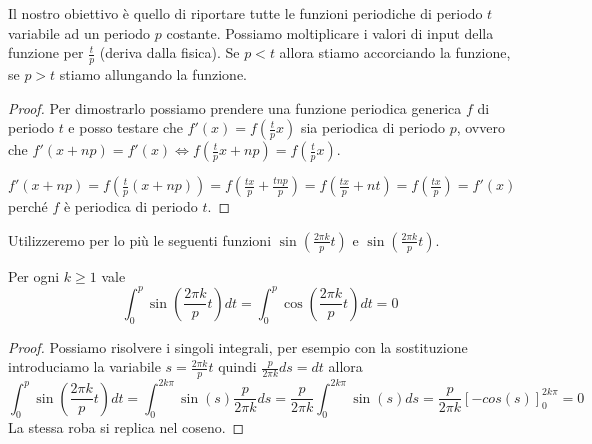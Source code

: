 Il nostro obiettivo è quello di riportare tutte le funzioni periodiche di periodo $t$
variabile ad un periodo $p$ costante. Possiamo moltiplicare i valori di input della 
funzione per $\frac{t}{p}$ (deriva dalla fisica). Se $p<t$ allora stiamo accorciando 
la funzione, se $p>t$ stiamo allungando la funzione.

\begin{proof}
    Per dimostrarlo possiamo prendere una funzione periodica generica $f$ di periodo $t$
    e posso testare che $f'(x) = f(\frac{t}{p}x)$ sia periodica di periodo $p$, 
    ovvero che $f'(x+np) = f'(x) \iff f(\frac{t}{p}x + np) = f(\frac{t}{p}x)$.

    $f'(x+np) = f(\frac{t}{p}(x + np))= f(\frac{tx}{p} + \frac{tnp}{p}) = f(\frac{tx}{p} + nt)
    =f(\frac{tx}{p}) =f'(x)$ perché $f$ è periodica di periodo $t$.
\end{proof}

Utilizzeremo per lo più le seguenti funzioni $\sin (\frac{2\pi k}{p}t)$ e $\sin (\frac{2\pi k}{p}t)$.
\begin{nota}
    Per ogni $k \ge 1$ vale
    \begin{equation*}
        \int_{0}^{p}\sin \left(\frac{2\pi k}{p}t\right) dt =  
        \int_{0}^{p}\cos \left(\frac{2\pi k}{p}t\right) dt = 0
    \end{equation*}
    \begin{proof}
        Possiamo risolvere i singoli integrali, per esempio con la sostituzione 
        introduciamo la variabile $s= \frac{2\pi k}{p}t$ quindi $\frac{p}{2\pi k}ds =dt$
        allora 
        $$\int_{0}^{p}\sin \left(\frac{2\pi k}{p}t\right) dt = 
        \int_{0}^{2k\pi}\sin \left(s\right)\frac{p}{2\pi k}ds = \frac{p}{2\pi k} \int_{0}^{2k\pi}\sin \left(s\right)ds =\frac{p}{2\pi k} \left[-cos(s)\right]_0^{2k\pi} = 0 $$
        La stessa roba si replica nel coseno. 
    \end{proof}
\end{nota}


